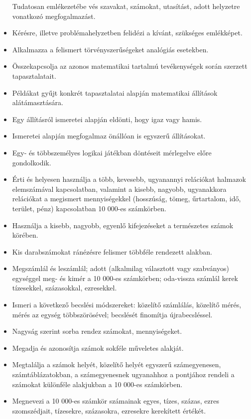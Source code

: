 \begin{itemize}
  Tudatosan emlékezetébe vés szavakat, számokat, utasítást, adott
  helyzetre vonatkozó megfogalmazást.
\item
  Kérésre, illetve problémahelyzetben felidézi a kívánt, szükséges
  emlékképet.
\item
  Alkalmazza a felismert törvényszerűségeket analógiás esetekben.
\item
  Összekapcsolja az azonos matematikai tartalmú tevékenységek során
  szerzett tapasztalatait.
\item
  Példákat gyűjt konkrét tapasztalatai alapján matematikai állítások
  alátámasztására.
\item
  Egy állításról ismeretei alapján eldönti, hogy igaz vagy hamis.
\item
  Ismeretei alapján megfogalmaz önállóan is egyszerű állításokat.
\item
  Egy- és többszemélyes logikai játékban döntéseit mérlegelve előre
  gondolkodik.
\item
  Érti és helyesen használja a több, kevesebb, ugyanannyi relációkat
  halmazok elemszámával kapcsolatban, valamint a kisebb, nagyobb,
  ugyanakkora relációkat a megismert mennyiségekkel (hosszúság, tömeg,
  űrtartalom, idő, terület, pénz) kapcsolatban 10 000-es számkörben.
\item
  Használja a kisebb, nagyobb, egyenlő kifejezéseket a természetes
  számok körében.
\item
  Kis darabszámokat ránézésre felismer többféle rendezett alakban.
\item
  Megszámlál és leszámlál; adott (alkalmilag választott vagy szabványos)
  egységgel meg- és kimér a 10 000-es számkörben; oda-vissza számlál
  kerek tízesekkel, százasokkal, ezresekkel.
\item
  Ismeri a következő becslési módszereket: közelítő számlálás, közelítő
  mérés, mérés az egység többszörösével; becslését finomítja
  újrabecsléssel.
\item
  Nagyság szerint sorba rendez számokat, mennyiségeket.
\item
  Megadja és azonosítja számok sokféle műveletes alakját.
\item
  Megtalálja a számok helyét, közelítő helyét egyszerű számegyenesen,
  számtáblázatokban, a számegyenesnek ugyanahhoz a pontjához rendeli a
  számokat különféle alakjukban a 10 000-es számkörben.
\item
  Megnevezi a 10 000-es számkör számainak egyes, tízes, százas, ezres
  szomszédjait, tízesekre, százasokra, ezresekre kerekített értékét.

\end{itemize}
